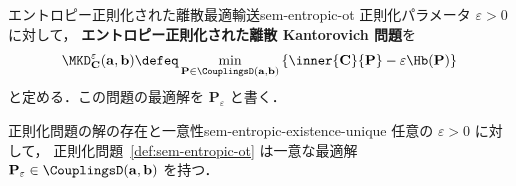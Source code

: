 \begin{definition}{エントロピー正則化された離散最適輸送}{sem-entropic-ot}
  正則化パラメータ $\varepsilon > 0$ に対して，
  \textbf{エントロピー正則化された離散 Kantorovich 問題}を
  \[
    \MKD_{\mathbf{C}}^\varepsilon(\mathbf{a}, \mathbf{b})
    \defeq
    \min_{\mathbf{P} \in \CouplingsD(\mathbf{a}, \mathbf{b})}
    \left\{
      \inner{\mathbf{C}}{\mathbf{P}}
      - \varepsilon \Hb(\mathbf{P})
    \right\}
  \]
  と定める．この問題の最適解を $\mathbf{P}_\varepsilon$ と書く．
\end{definition}

\begin{proposition}{正則化問題の解の存在と一意性}{sem-entropic-existence-unique}
  任意の $\varepsilon > 0$ に対して，
  正則化問題~\ref{def:sem-entropic-ot} は一意な最適解
  $\mathbf{P}_\varepsilon \in \CouplingsD(\mathbf{a}, \mathbf{b})$ を持つ．
\end{proposition}

